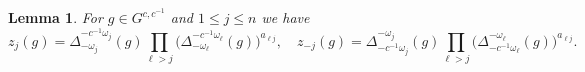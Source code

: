 \documentclass[12pt]{amsart}
\newtheorem{lemma}[theorem]{Lemma}
\theoremstyle{remark}
\numberwithin{equation}{section}
\begin{document}


\begin{lemma}\label{lemma:coefficients_identities}
For $g \in G^{c,c^{-1}}$ and $1 \leq j \leq n$ we have
  \begin{equation*}
z_j(g) =\Delta_{-\omega_j}^{-c^{-1}\omega_j}(g)
    \prod_{\ell>j}\Big(\Delta_{-\omega_\ell}^{-c^{-1}\omega_\ell}(g)\Big)^{a_{\ell j}},\quad
z_{-j}(g) = \Delta_{-c^{-1}\omega_j}^{-\omega_j}(g)
    \prod_{\ell>j}\Big(\Delta_{-c^{-1}\omega_\ell}^{-\omega_\ell}(g)\Big)^{a_{\ell j}}.
  \end{equation*}
\end{lemma}
\end{document}
